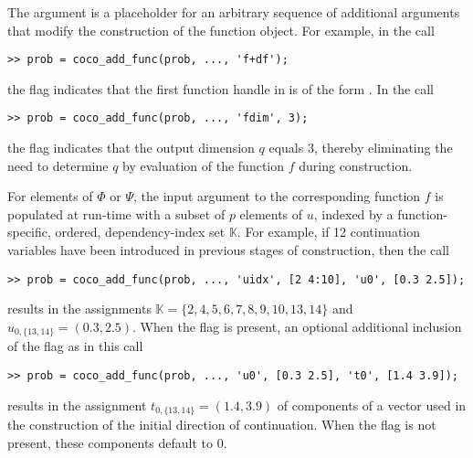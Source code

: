 The argument  is a placeholder for an arbitrary sequence of additional arguments that modify the construction of the function object. For example, in the call
\begin{lstlisting}[language=coco-highlight]
>> prob = coco_add_func(prob, ..., 'f+df');
\end{lstlisting}
the flag  indicates that the first function handle in  is of the form . In the call
\begin{lstlisting}[language=coco-highlight]
>> prob = coco_add_func(prob, ..., 'fdim', 3);
\end{lstlisting}
the flag  indicates that the output dimension $q$ equals $3$, thereby eliminating the need to determine $q$ by evaluation of the function $f$ during construction.

For elements of $\Phi$ or $\Psi$, the input argument to the corresponding function $f$ is populated at run-time with a subset of $p$ elements of $u$, indexed by a function-specific, ordered, dependency-index set $\mathbb{K}$. For example, if 12 continuation variables have been introduced in previous stages of construction, then the call
\begin{lstlisting}[language=coco-highlight]
>> prob = coco_add_func(prob, ..., 'uidx', [2 4:10], 'u0', [0.3 2.5]);
\end{lstlisting}
results in the assignments $\mathbb{K}=\{2,4,5,6,7,8,9,10,13,14\}$ and $u_{0,\{13,14\}}=(0.3,2.5)$. When the  flag is present, an optional additional inclusion of the flag  as in this call
\begin{lstlisting}[language=coco-highlight]
>> prob = coco_add_func(prob, ..., 'u0', [0.3 2.5], 't0', [1.4 3.9]);
\end{lstlisting}
results in the assignment $t_{0,\{13,14\}}=(1.4,3.9)$ of components of a vector used in the construction of the initial direction of continuation. When the  flag is not present, these components default to $0$.
 
